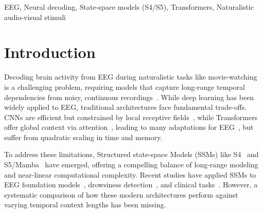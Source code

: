 \documentclass{article}
\newcommand{\eegtrans}{EEGXF}
\begin{document}
\begin{abstract}
\end{abstract}


%
\begin{keywords}
EEG, Neural decoding, State‑space models (S4/S5), Transformers, Naturalistic audio-visual stimuli
\end{keywords}
%

\section{Introduction}
\label{sec:intro}

Decoding brain activity from EEG during naturalistic tasks like movie-watching is a challenging problem, requiring models that capture long-range temporal dependencies from noisy, continuous recordings~\cite{shirazi2024hbn}. While deep learning has been widely applied to EEG, traditional architectures face fundamental trade-offs. CNNs are efficient but constrained by local receptive fields~\cite{roy2019deep, schirrmeister2017deep}, while Transformers offer global context via attention~\cite{vaswani2017attention}, leading to many adaptations for EEG~\cite{song2023eeg, wang2024dbconformer, abibullaev2023transformerreview}, but suffer from quadratic scaling in time and memory.

To address these limitations, Structured state-space Models (SSMs) like S4~\cite{gu2022efficientlymodelinglongsequences} and S5/Mamba~\cite{gu2023mamba} have emerged, offering a compelling balance of long-range modeling and near-linear computational complexity. Recent studies have applied SSMs to EEG foundation models~\cite{wang2025eegmamba}, drowsiness detection~\cite{siddhad2024drowzee}, and clinical tasks~\cite{tran2024eegssm, li2025dgmamba}. However, a systematic comparison of how these modern architectures perform against varying temporal context lengths has been missing.
\end{document}
